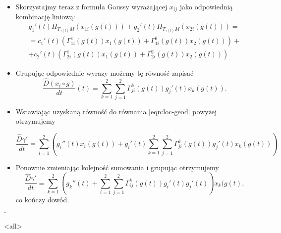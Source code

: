 \begin{itemize}
\item Skorzystajmy teraz z formuła Gaussy wyrażającej $x_{ij}$ jako odpowiednią kombinację liniową:
\begin{multline*}
g_1'(t)\Pi_{T_{\gamma(t)}M}\left(x_{1i}(g(t))\right)+g_2'(t)\Pi_{T_{\gamma(t)}M}\left(x_{2i}(g(t))\right)=\\
=c_1'(t)\left(\Gamma_{1i}^1(g(t)) x_1(g(t)) +\Gamma_{1i}^2(g(t)) x_2(g(t)) \right)+\\ +c_2'(t)\left(\Gamma_{2i}^1(g(t)) x_1(g(t)) +\Gamma_{2i}^2(g(t)) x_2(g(t)) \right)
\end{multline*}

\item Grupując odpowiednie wyrazy możemy tę równość zapisać
\[\frac{\widehat{D}(x_i\circ g)}{dt}(t)=\sum_{k=1}^2\sum_{j=1}^2\Gamma^k_{ji}(g(t))g_{j}'(t)x_{k}(g(t)).\]

\item Wstawiając uzyskaną równość do równania \ref{eqn:loc-geod} powyżej otrzymujemy

\[\frac{\widehat{D}\gamma'}{dt}=\sum_{i=1}^2\left(g_i''(t)x_i(g(t))+g_{i}'(t)\sum_{k=1}^2\sum_{j=1}^2\Gamma^k_{ji}(g(t))g_{j}'(t)x_{k}(g(t))\right)\]

\item Ponownie zmieniając kolejność sumowania i grupując otrzymujemy
\[\frac{\widehat{D}\gamma'}{dt}=\sum_{k=1}^2\left(g_{k}''(t)+\sum_{i=1}^2\sum_{j=1}^2\Gamma_{ij}^k(g(t))g_i'(t)g_{j}'(t)\right) x_k(g(t),\]
co kończy dowód.
\end{itemize}

\hfill $\square$

\mode<all>{}

